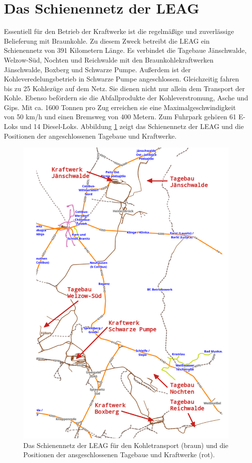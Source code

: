 \section{Das Schienennetz der LEAG}

Essentiell für den Betrieb der Kraftwerke ist die regelmäßige und zuverlässige Belieferung mit Braunkohle. Zu diesem Zweck betreibt die LEAG  ein Schienennetz von 391 Kilometern Länge\cite{hertzer_eisenbahner_2018}. Es verbindet die Tagebaue Jänschwalde, Welzow-Süd, Nochten und Reichwalde mit den Braunkohlekraftwerken Jänschwalde, Boxberg und Schwarze Pumpe. Außerdem ist der Kohleveredelungsbetrieb in Schwarze Pumpe angeschlossen\cite{noauthor_tagebau_2023}. Gleichzeitig fahren bis zu 25 Kohlezüge auf dem Netz. Sie dienen nicht nur allein dem Transport der Kohle. Ebenso befördern sie die Abfallprodukte der Kohleverstromung, Asche und Gips. Mit ca. 1600 Tonnen pro Zug erreichen sie eine Maximalgeschwindigkeit von 50 km/h und einen Bremsweg von 400 Metern. Zum Fuhrpark gehören 61 E-Loks und 14 Diesel-Loks\cite{hertzer_eisenbahner_2018}. Abbildung \ref{fig:leag-netz} zeigt das Schienennetz der LEAG und die Positionen der angeschlossenen Tagebaue und Kraftwerke.

\begin{figure}[H]
	\centering
	\includegraphics[width=0.75\linewidth]{images/LEAG-Netz-annotated.png}
	\caption{Das Schienennetz der LEAG für den Kohletransport (braun) und die Positionen der ansgeschlossenen Tagebaue und Kraftwerke (rot).}
	\label{fig:leag-netz}
\end{figure}